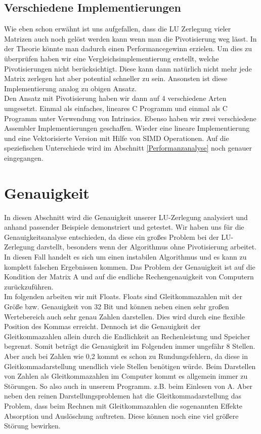 \documentclass[course=erap]{aspdoc}
\begin{document}
\subsection{Verschiedene Implementierungen}
Wie eben schon erwähnt ist uns aufgefallen, dass die LU Zerlegung vieler Matrizen auch noch gelöst werden kann wenn man die Pivotisierung weg lässt. In der Theorie könnte man dadurch einen Performancegewinn erzielen. 
Um dies zu überprüfen haben wir eine Vergleichsimplementierung erstellt, welche Pivotisierungen nicht berücksichtigt. Diese kann dann natürlich nicht mehr jede Matrix zerlegen hat aber potential schneller zu sein.
Ansonsten ist diese Implementierung analog zu obigen Ansatz.\\ 
Den Ansatz mit Pivotisierung haben wir dann auf 4 verschiedene Arten umgesetzt. Einmal als einfaches, lineares C Programm und einmal als C Programm unter Verwendung von Intrinsics.
Ebenso haben wir zwei verschiedene Assembler Implementierungen geschaffen. Wieder eine lineare Implementierung und eine Vektorisierte Version mit Hilfe von SIMD Operationen.
Auf die speziefischen Unterschiede wird im Abschnitt \ref{Performanzanalyse} noch genauer eingegangen.




\section{Genauigkeit}
In diesen Abschnitt wird die Genauigkeit unserer LU-Zerlegung analysiert und anhand 
passender Beispiele demonstriert und getestet. Wir haben uns für die 
Genauigkeitsanalyse entschieden, da diese ein großes Problem bei der LU-Zerlegung 
darstellt, besonders wenn der Algorithmus ohne Pivotisierung arbeitet. In diesen Fall 
handelt es sich um einen instabilen Algorithmus und es kann zu komplett 
falschen Ergebnissen kommen. Das Problem der Genauigkeit ist auf die Kondition der 
Matrix A und auf die endliche Rechengenauigkeit von Computern zurückzuführen. \\

Im folgenden arbeiten wir mit Floats. Floats sind Gleitkommazahlen mit der Größe 
bzw. Genauigkeit von 32 Bit und können neben einen sehr großen Wertebereich auch 
sehr genau Zahlen darstellen. Dies wird durch eine flexible Position des Kommas erreicht. 
Dennoch ist die Genauigkeit der Gleitkommazahlen allein durch die Endlichkeit an 
Rechenleistung und Speicher begrenzt. Somit beträgt die 
Genauigkeit im Folgenden immer ungefähr 8 Stellen. Aber auch bei Zahlen wie 
0,2 kommt es schon zu Rundungsfehlern, da diese in Gleitkommadarstellung unendlich 
viele Stellen benötigen würde. Beim Darstellen von Zahlen als Gleitkommazahlen im Computer 
kommt es allgemein immer zu Störungen. So also auch in unserem Programm. z.B. beim Einlesen von A.
Aber neben den reinen Darstellungsproblemen hat die Gleitkommadarstellung das Problem, dass beim Rechnen mit 
Gleitkommazahlen die sogenannten Effekte Absorption und Auslöschung auftreten. Diese können noch eine viel größere Störung bewirken.
\end{document}
